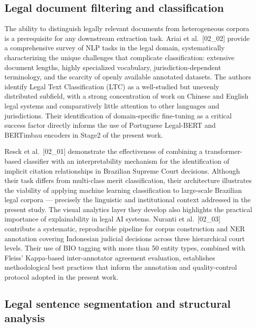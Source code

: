 \documentclass[preprint,a4paper,fleqn]{cas-dc}
\begin{document}
\subsection{Legal document filtering and classification}

The ability to distinguish legally relevant documents from heterogeneous corpora is a prerequisite for any downstream extraction task. Ariai et al.~[02\_02] provide a comprehensive survey of NLP tasks in the legal domain, systematically characterizing the unique challenges that complicate classification: extensive document lengths, highly specialized vocabulary, jurisdiction-dependent terminology, and the scarcity of openly available annotated datasets. The authors identify Legal Text Classification (LTC) as a well-studied but unevenly distributed subfield, with a strong concentration of work on Chinese and English legal systems and comparatively little attention to other languages and jurisdictions. Their identification of domain-specific fine-tuning as a critical success factor directly informs the use of Portuguese Legal-BERT and BERTimbau encoders in Stage2 of the present work.

Resck et al.~[02\_01] demonstrate the effectiveness of combining a transformer-based classifier with an interpretability mechanism for the identification of implicit citation relationships in Brazilian Supreme Court decisions. Although their task differs from multi-class merit classification, their architecture illustrates the viability of applying machine learning classification to large-scale Brazilian legal corpora — precisely the linguistic and institutional context addressed in the present study. The visual analytics layer they develop also highlights the practical importance of explainability in legal AI systems. Nuranti et al.~[02\_03] contribute a systematic, reproducible pipeline for corpus construction and NER annotation covering Indonesian judicial decisions across three hierarchical court levels. Their use of BIO tagging with more than 50 entity types, combined with Fleiss' Kappa-based inter-annotator agreement evaluation, establishes methodological best practices that inform the annotation and quality-control protocol adopted in the present work.

\subsection{Legal sentence segmentation and structural analysis}
\end{document}
